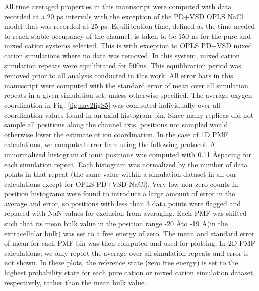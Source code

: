 \begin{refsection}
All time averaged properties in this manuscript were computed with data recorded at a 20 ps intervals with the exception of the PD+VSD OPLS NaCl model that was recorded at 25 ps. Equilibration time, defined as the time needed to reach stable occupancy of the channel, is taken to be 150 ns for the pure and mixed cation systems selected. This is with exception to OPLS PD+VSD mixed cation simulations where no data was removed. In this system, mixed cation simulation repeats were equilibrated for 500ns. This equilibration period was removed prior to all analysis conducted in this work. All error bars in this manuscript were computed with the standard error of mean over all simulation repeats in a given simulation set, unless otherwise specified. The average oxygen coordination in Fig. \ref{fig:nav2figS5} was computed individually over all coordination values found in an axial histogram bin. Since many replicas did not sample all positions along the channel axis, positions not sampled would otherwise lower the estimate of ion coordination. 
In the case of 1D PMF calculations, we computed error bars using the following protocol. A unnormalized histogram of ionic positions was computed with 0.11 \AA spacing for each simulation repeat. Each histogram was normalized by the number of data points in that repeat (the same value within a simulation dataset in all our calculations except for OPLS PD+VSD NaCl). Very low non-zero counts in position histograms were found to introduce a large amount of error in the average and error, so positions with less than 3 data points were flagged and replaced with NaN values for exclusion from averaging. Each PMF was shifted such that its mean bulk value in the position range -20 \AA to -19 \AA (in the extracellular bulk) was set to a free energy of zero. The mean and standard error of mean for each PMF bin was then computed and used for plotting. In 2D PMF calculations, we only report the average over all simulation repeats and error is not shown. In these plots, the reference state (zero free energy) is set to the highest probability state for each pure cation or mixed cation simulation dataset, respectively, rather than the mean bulk value.
 










\end{refsection}
